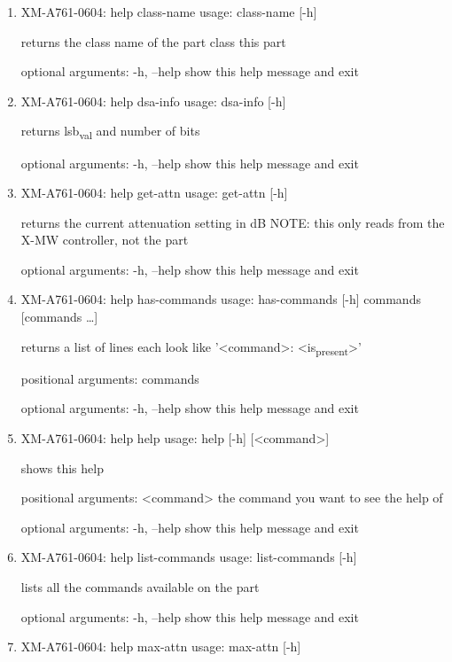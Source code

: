 \documentclass[11pt]{article}
\begin{document}
\begin{enumerate}
\item XM-A761-0604: help class-name
\label{sec:org6114902}
usage: class-name [-h]

returns the class name of the part class this part

optional arguments:
  -h, --help  show this help message and exit

\item XM-A761-0604: help dsa-info
\label{sec:org1d98e5f}
usage: dsa-info [-h]

returns lsb\textsubscript{val} and number of bits

optional arguments:
  -h, --help  show this help message and exit

\item XM-A761-0604: help get-attn
\label{sec:org539541d}
usage: get-attn [-h]

returns the current attenuation setting in dB NOTE: this only reads from the
X-MW controller, not the part

optional arguments:
  -h, --help  show this help message and exit

\item XM-A761-0604: help has-commands
\label{sec:org1c05ce8}
usage: has-commands [-h] commands [commands \ldots{}]

returns a list of lines each look like '<command>: <is\textsubscript{present}>'

positional arguments:
  commands

optional arguments:
  -h, --help  show this help message and exit

\item XM-A761-0604: help help
\label{sec:org9012cdb}
usage: help [-h] [<command>]

shows this help

positional arguments:
  <command>   the command you want to see the help of

optional arguments:
  -h, --help  show this help message and exit

\item XM-A761-0604: help list-commands
\label{sec:org759b69c}
usage: list-commands [-h]

lists all the commands available on the part

optional arguments:
  -h, --help  show this help message and exit

\item XM-A761-0604: help max-attn
\label{sec:org275292d}
usage: max-attn [-h]


\end{enumerate}
\end{document}
